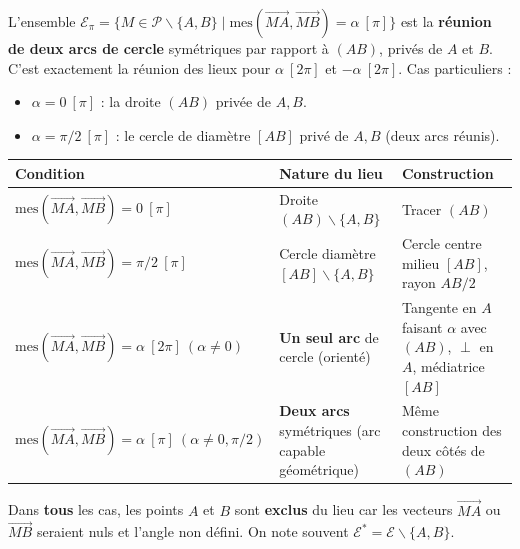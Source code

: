 \documentclass[11pt]{article}
\def\setminus{\mathbin{\backslash}}\let\smallsetminus\setminus
\begin{document}
\begin{propriete}[{Lieu : $\mathrm{mes}(\overrightarrow{MA}, \overrightarrow{MB}) = \alpha\ [\pi]$}]
L'ensemble $\mathcal{E}_{\pi} = \{ M \in \mathcal{P} \setminus \{A,B\} \mid \mathrm{mes}(\overrightarrow{MA}, \overrightarrow{MB}) = \alpha\ [\pi] \}$ est la \textbf{réunion de deux arcs de cercle} symétriques par rapport à $(AB)$, privés de $A$ et $B$.
C'est exactement la réunion des lieux pour $\alpha\ [2\pi]$ et $-\alpha\ [2\pi]$.
Cas particuliers :
\begin{itemize}
\item $\alpha = 0\ [\pi]$ : la droite $(AB)$ privée de $A, B$.
\item $\alpha = \pi/2\ [\pi]$ : le cercle de diamètre $[AB]$ privé de $A, B$ (deux arcs réunis).
\end{itemize}
\end{propriete}

\begin{aretenir}
\begin{center}
\begin{tabularx}{\linewidth}{|l|X|X|}\hline
\textbf{Condition} & \textbf{Nature du lieu} & \textbf{Construction} \\ \hline
$\mathrm{mes}(\overrightarrow{MA}, \overrightarrow{MB}) = 0\ [\pi]$ & Droite $(AB) \setminus \{A,B\}$ & Tracer $(AB)$ \\ \hline
$\mathrm{mes}(\overrightarrow{MA}, \overrightarrow{MB}) = \pi/2\ [\pi]$ & Cercle diamètre $[AB] \setminus \{A,B\}$ & Cercle centre milieu $[AB]$, rayon $AB/2$ \\ \hline
$\mathrm{mes}(\overrightarrow{MA}, \overrightarrow{MB}) = \alpha\ [2\pi]\ (\alpha \neq 0)$ & \textbf{Un seul arc} de cercle (orienté) & Tangente en $A$ faisant $\alpha$ avec $(AB)$, $\perp$ en $A$, médiatrice $[AB]$ \\ \hline
$\mathrm{mes}(\overrightarrow{MA}, \overrightarrow{MB}) = \alpha\ [\pi]\ (\alpha \neq 0, \pi/2)$ & \textbf{Deux arcs} symétriques (arc capable géométrique) & Même construction des deux côtés de $(AB)$ \\ \hline
\end{tabularx}
\end{center}
\end{aretenir}

\begin{attention}
Dans \textbf{tous} les cas, les points $A$ et $B$ sont \textbf{exclus} du lieu car les vecteurs $\overrightarrow{MA}$ ou $\overrightarrow{MB}$ seraient nuls et l'angle non défini. On note souvent $\mathcal{E}^* = \mathcal{E} \setminus \{A,B\}$.
\end{attention}
\end{document}
